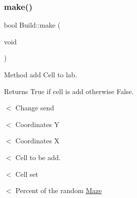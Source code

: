 \subsubsection{\texorpdfstring{make()}{make()}}
{\footnotesize\ttfamily bool Build\+::make (\begin{DoxyParamCaption}\item[{void}]{ }\end{DoxyParamCaption})}



Method add Cell to lab. 

\begin{DoxyReturn}{Returns}
True if cell is add otherwise False. 
\end{DoxyReturn}
$<$ Change send

$<$ Coordinates Y

$<$ Coordinates X

$<$ Cell to be add.

$<$ Cell set

$<$ Percent of the random \hyperlink{classMaze}{Maze}

